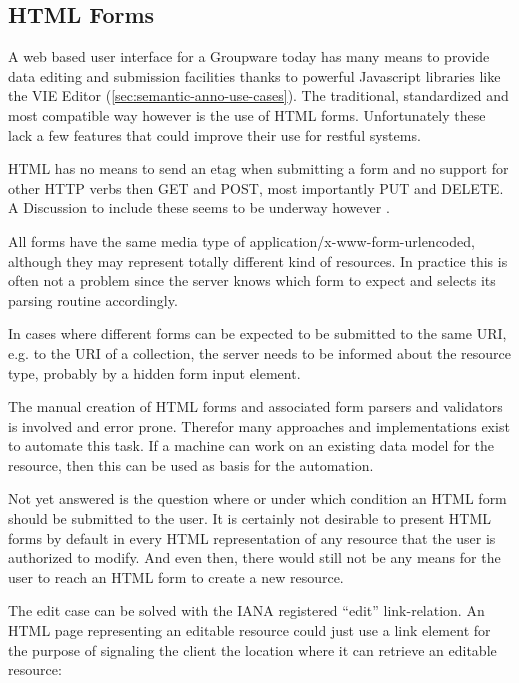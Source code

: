 \documentclass[11pt,a4paper,headsepline,twoside]{scrartcl}		%
\begin{document}
\subsection{HTML Forms}
\label{sec:html-forms}

A web based user interface for a Groupware today has many means to provide data
editing and submission facilities thanks to powerful Javascript libraries like
the VIE Editor (\autoref{sec:semantic-anno-use-cases}). The traditional,
standardized and most compatible way however is the use of HTML
forms. Unfortunately these lack a few features that could improve their use for
restful systems.

HTML has no means to send an etag when submitting a form and no support for
other HTTP verbs then GET and POST, most importantly PUT and DELETE. A
Discussion to include these seems to be underway however \cite{Amundsen2011}.

All forms have the same media type of application/x-www-form-urlencoded,
although they may represent totally different kind of resources. In practice
this is often not a problem since the server knows which form to expect and
selects its parsing routine accordingly.

In cases where different forms can be expected to be submitted to the same URI,
e.g. to the URI of a collection, the server needs to be informed about the
resource type, probably by a hidden form input element.

The manual creation of HTML forms and associated form parsers and validators is
involved and error prone. Therefor many approaches and implementations exist to
automate this task. If a machine can work on an existing data model for the
resource, then this can be used as basis for the automation.


Not yet answered is the question where or under which condition an HTML form
should be submitted to the user. It is certainly not desirable to present HTML
forms by default in every HTML representation of any resource that the user is
authorized to modify. And even then, there would still not be any means for the
user to reach an HTML form to create a new resource.

The edit case can be solved with the IANA registered ``edit'' link-relation. An
HTML page representing an editable resource could just use a link element for
the purpose of signaling the client the location where it can retrieve an
editable resource:
\end{document}
